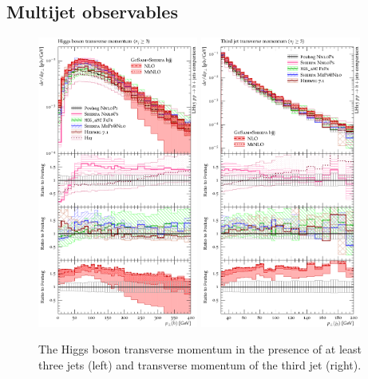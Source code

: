 
\subsection{Multijet observables}
\label{sec:hjetscomp:results:mjobs}

\begin{figure}[t!]
  \centering
  \includegraphics[width=0.47\textwidth]{figures/hjetscomp_H_jjj_pT_incl.pdf}
  \quad
  \includegraphics[width=0.47\textwidth]{figures/hjetscomp_jet3_pT_incl.pdf}
  \caption{
    The Higgs boson transverse momentum in the presence of at least three 
    jets (left) and transverse momentum of the third jet (right).
    \label{fig:higgscomp:results:1obs:hpt_ht}
  }
\end{figure}

